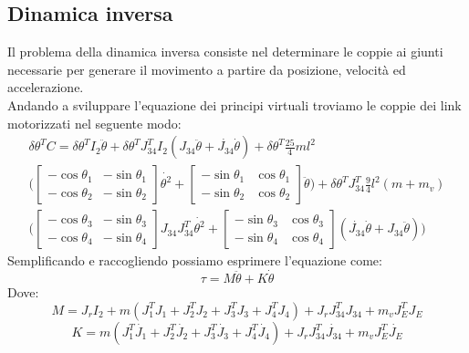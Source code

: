 \subsection{Dinamica inversa}
Il problema della dinamica inversa consiste nel determinare le coppie ai giunti necessarie per generare il movimento a partire da posizione, velocità ed accelerazione.
\\Andando a sviluppare l'equazione dei principi virtuali troviamo le coppie dei link motorizzati nel seguente modo:
\begin{equation*}
\begin{aligned}
    \delta \theta^T C = \delta \theta^T I_2 \ddot{\theta} + \delta \theta^T J_{34}^T I_2(J_{34}\ddot{\theta}+\dot{J_{34}}\dot{\theta})+ \delta \theta^T \frac{25}{4}ml^2\\\bigg(\begin{bmatrix}
    -\cos\theta_1 & -\sin\theta_1 \\ -\cos\theta_2 & -\sin\theta_2
    \end{bmatrix}
    \dot{\theta^2} + \begin{bmatrix}
    -\sin\theta_1 & \cos\theta_1 \\ -\sin\theta_2 & \cos\theta_2
    \end{bmatrix} \ddot{\theta}\bigg) +  \delta \theta^T J_{34}^T\frac{9}{4}l^2(m+m_v)\\\bigg(\begin{bmatrix}
    -\cos\theta_3 & -\sin\theta_3 \\ -\cos\theta_4 & -\sin\theta_4
    \end{bmatrix}J_{34}J_{34}^T\dot{\theta^2}+\begin{bmatrix}
    -\sin\theta_3 & \cos\theta_3 \\ -\sin\theta_4 & \cos\theta_4
    \end{bmatrix}(\dot{J_{34}}\dot{\theta}+J_{34}\ddot{\theta})\bigg)
    \end{aligned}
\end{equation*}
Semplificando e raccogliendo possiamo esprimere l'equazione come:
\begin{equation}
    \tau = M \ddot{\theta} + K \dot{\theta}
    \label{eq:dinamicaInv}
\end{equation}
Dove:
\begin{equation}
    M = J_r I_2 + m(J_1^T J_1 + J_2^TJ_2+J_3^TJ_3+J_4^TJ_4)+J_rJ_{34}^TJ_{34} + m_vJ_E^TJ_E
    \label{eq:M}
\end{equation}
\begin{equation}
    K = m(J_1^T\dot{J_1}+J_2^T\dot{J_2}+J_3^T\dot{J_3}+J_4^T\dot{J_4})+J_rJ_{34}^T\dot{J_{34}}+m_vJ_E^T\dot{J_E}
    \label{eq:K}
\end{equation}
